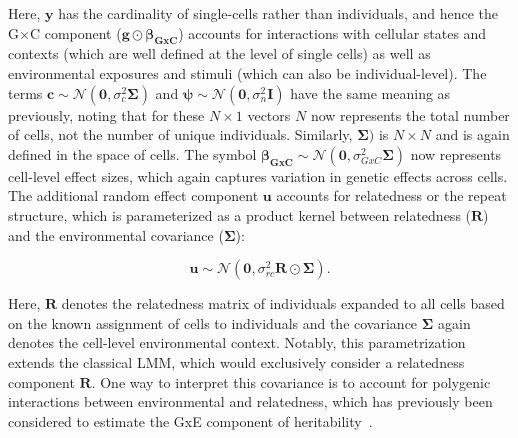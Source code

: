 Here, $\mathbf{y}$ has the cardinality of single-cells rather than individuals, and hence the G$\times$C component ($\mathbf{g} \odot \boldsymbol{\beta_{GxC}}$) accounts for interactions with cellular states and contexts (which are well defined at the level of single cells) as well as environmental exposures and stimuli (which can also be individual-level).
The terms $\mathbf{c} \sim \mathcal{N}(\mathbf{0},\sigma_c^2 \boldsymbol{\Sigma})$ and $\boldsymbol{\psi} \sim \mathcal{N}(\mathbf{0},\sigma_n^2\mathbf{I})$ have the same meaning as previously, noting that for these $N \times 1$ vectors $N$ now represents the total number of cells, not the number of unique individuals.
Similarly, $\boldsymbol{\Sigma})$ is $N \times N$ and is again defined in the space of cells.
The symbol $\boldsymbol{\beta_{GxC}}\sim \mathcal{N}(\mathbf{0},\sigma_{GxC}^2 \boldsymbol{\Sigma})$ now represents cell-level effect sizes, which again captures variation in genetic effects across cells.
The additional random effect component $\mathbf{u}$ accounts for relatedness or the repeat structure, which is parameterized as a product kernel between relatedness ($\mathbf{R}$) and the environmental covariance ($\boldsymbol{\Sigma}$):

\begin{equation}
    \mathbf{u} \sim \mathcal{N}(\mathbf{0},\sigma_{rc}^2 \mathbf{R} \odot \boldsymbol{\Sigma}).
\end{equation}

Here, $\mathbf{R}$ denotes the relatedness matrix of individuals expanded to all cells based on the known assignment of cells to individuals and the covariance $\mathbf{\Sigma}$ again denotes the cell-level environmental context.
Notably, this parametrization extends the classical LMM, which would exclusively consider a relatedness component $\mathbf{R}$.
One way to interpret this covariance is to account for polygenic interactions between environmental and relatedness, which has previously been considered to estimate the GxE component of heritability~\cite{heckerman2016linear}.


